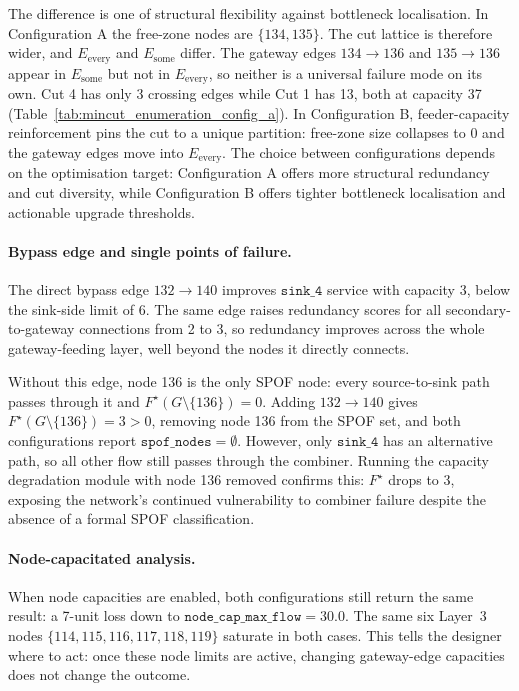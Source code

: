 \documentclass[12pt]{report}
\begin{document}
The difference is one of structural flexibility against bottleneck localisation. In Configuration A the free-zone nodes are $\{134,135\}$. The cut lattice is therefore wider, and $E_{\text{every}}$ and $E_{\text{some}}$ differ. The gateway edges $134 \to 136$ and $135 \to 136$ appear in $E_{\text{some}}$ but not in $E_{\text{every}}$, so neither is a universal failure mode on its own. Cut 4 has only 3 crossing edges while Cut 1 has 13, both at capacity 37 (Table~\ref{tab:mincut_enumeration_config_a}). In Configuration B, feeder-capacity reinforcement pins the cut to a unique partition: free-zone size collapses to 0 and the gateway edges move into $E_{\text{every}}$. The choice between configurations depends on the optimisation target: Configuration A offers more structural redundancy and cut diversity, while Configuration B offers tighter bottleneck localisation and actionable upgrade thresholds.

\paragraph{Bypass edge and single points of failure.}

The direct bypass edge $132 \to 140$ improves $\texttt{sink\_4}$ service with capacity 3, below the sink-side limit of 6. The same edge raises redundancy scores for all secondary-to-gateway connections from 2 to 3, so redundancy improves across the whole gateway-feeding layer, well beyond the nodes it directly connects.

Without this edge, node 136 is the only SPOF node: every source-to-sink path passes through it and $F^\star(G \setminus \{136\}) = 0$. Adding $132 \to 140$ gives $F^\star(G \setminus \{136\}) = 3 > 0$, removing node 136 from the SPOF set, and both configurations report $\texttt{spof\_nodes} = \emptyset$. However, only $\texttt{sink\_4}$ has an alternative path, so all other flow still passes through the combiner. Running the capacity degradation module with node 136 removed confirms this: $F^\star$ drops to 3, exposing the network's continued vulnerability to combiner failure despite the absence of a formal SPOF classification.

\paragraph{Node-capacitated analysis.}
When node capacities are enabled, both configurations still return the same result: a 7-unit loss down to $\texttt{node\_cap\_max\_flow}=30.0$. The same six Layer~3 nodes $\{114,115,116,117,118,119\}$ saturate in both cases. This tells the designer where to act: once these node limits are active, changing gateway-edge capacities does not change the outcome.
\end{document}

